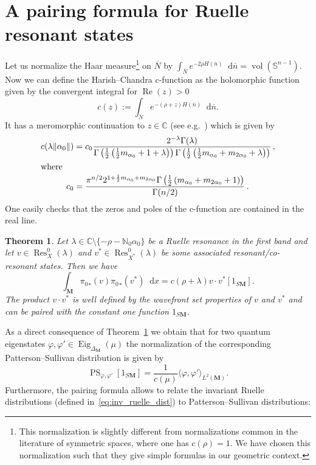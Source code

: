 \documentclass[10pt]{amsart}
\newtheorem{theo}[cdrthm]{Theorem}
\theoremstyle{definition}
\DeclareMathOperator{\Res}{Res}
\DeclareMathOperator{\Eig}{Eig}
\DeclareMathOperator{\Real}{Re}
\DeclareMathOperator{\vol}{vol}
\newcommand{\cc}{\mathbb{C}}
\newcommand{\N}{\mathbb{N}}
\newcommand{\intd}{\mathop{}\!\mathrm{d}}
\newcommand{\bn}{{\overline{n}}}
\newcommand{\bN}{{\overline{N}}}
\begin{document}
\section{A pairing formula for Ruelle resonant states}

Let us normalize the Haar measure\footnote{This normalization is slightly different from normalizations common in the literature of symmetric spaces, where one has $c(\rho)=1$. We have chosen this normalization such that they give simple formulas in our geometric context.} on $\bN$ by $\int_\bN e^{-2\rho H(\bn)} \intd \bn =\vol(\mathbb S^{n-1})$. Now we can define the Harish--Chandra c-function as the holomorphic function given by the convergent integral for $\Real(z)>0$
\begin{equation}\label{HCc}
c(z):=\int_\bN e^{-(\rho+z)H(\bn)} \intd \bn.
\end{equation}
It has a meromorphic continuation to $z\in\cc$ (see e.g.~\cite[IV.6]{Hel84}) which is given by
\begin{align*}
c(\lambda\|\alpha_0\|) &= c_0\frac{2^{-\lambda}\Gamma(\lambda)}{\Gamma\left(\frac{1}{2}\left(\frac{1}{2}m_{\alpha_0} + 1 +\lambda\right)\right)\Gamma\left(\frac{1}{2}\left(\frac{1}{2}m_{\alpha_0} + m_{2\alpha_0} + \lambda\right)\right)}\,,
\\
\intertext{where}
c_0 &= \frac{\pi^{n/2}2^{1+\frac{1}{2}m_{\alpha_0} + m_{2\alpha_0}}\Gamma\left(\frac{1}{2}\left(m_{\alpha_0} + m_{2\alpha_0}+1\right)\right)}{\Gamma(n/2)}\,.
\end{align*}
One easily checks that the zeros and poles of the c-function are contained in the real line.

\begin{theo}\label{thm:pairing_formula}
Let $\lambda\in\cc\setminus\{-\rho - \N_0\alpha_0\}$ be a Ruelle resonance in the first band and let $v\in \Res^0_X(\lambda)$ and $v^ *\in
\Res^0_{X^*}(\lambda)$ be some associated resonant/co-resonant states. Then we have
\[
\int_{\mathbf M} {\pi_0}_*(v) {\pi_0}_*(v^*) \intd x = c(\rho+\lambda) v\cdot v^* [1_{S\mathbf M}].
\]
The product $v\cdot v^*$ is well defined by the wavefront set properties of $v$ and $v^*$ and can be paired with the constant one function $1_{S\mathbf M}$.
\end{theo}


As a direct consequence of Theorem~\ref{thm:pairing_formula} we obtain that for two quantum eigenstates $\varphi,\varphi'\in \Eig_{\Delta_{\mathbf M}}(\mu)$ the normalization of the corresponding Patterson--Sullivan distribution is given by
\[
\operatorname{PS}_{\varphi,\varphi'}[1_{S\mathbf M}] = \frac{1}{c(\mu)} \langle\varphi,\varphi'\rangle_{L^2(\mathbf M)}.
\]
Furthermore, the pairing formula allows to relate the invariant Ruelle distributions (defined in~\eqref{eq:inv_ruelle_dist}) to Patterson--Sullivan distributions:
\end{document}
